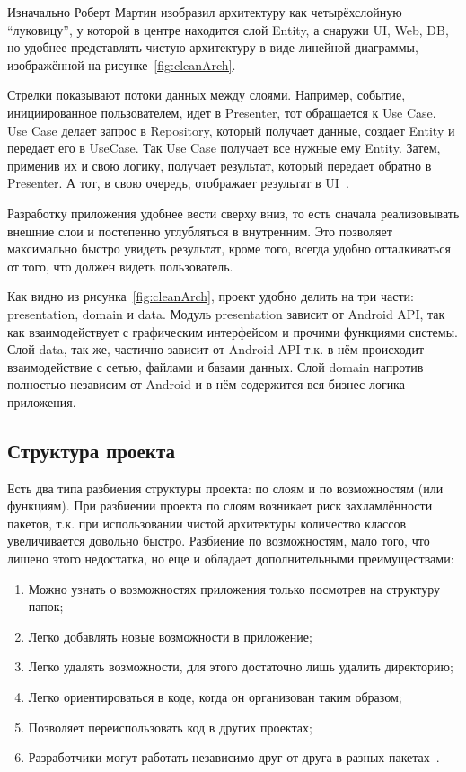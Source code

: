 Изначально Роберт Мартин изобразил архитектуру как четырёхслойную ``луковицу'', у которой в центре находится слой Entity, а снаружи UI, Web, DB, но удобнее представлять чистую архитектуру в виде линейной диаграммы, изображённой на рисунке~\ref{fig:cleanArch}.

Стрелки показывают потоки данных между слоями.
Например, событие, инициированное пользователем, идет в Presenter, тот обращается к Use Case.
Use Case делает запрос в Repository, который получает данные, создает Entity и передает его в UseCase.
Так Use Case получает все нужные ему Entity.
Затем, применив их и свою логику, получает результат, который передает обратно в Presenter.
А тот, в свою очередь, отображает результат в UI~\cite{habr:clean}.

Разработку приложения удобнее вести сверху вниз, то есть сначала реализовывать внешние слои и постепенно углубляться в внутренним.
Это позволяет максимально быстро увидеть результат, кроме того, всегда удобно отталкиваться от того, что должен видеть пользователь.

Как видно из рисунка~\ref{fig:cleanArch}, проект удобно делить на три части: presentation, domain и data.
Модуль presentation зависит от Android API, так как взаимодействует с графическим интерфейсом и прочими функциями системы.
Слой data, так же, частично зависит от Android API т.к. в нём происходит взаимодействие с сетью, файлами и базами данных.
Слой domain напротив полностью независим от Android и в нём содержится вся бизнес-логика приложения.

\subsection{Структура проекта}
\label{subsec:struct}

Есть два типа разбиения структуры проекта: по слоям и по возможностям (или функциям).
При разбиении проекта по слоям возникает риск захламлённости пакетов, т.к. при использовании чистой архитектуры количество классов увеличивается довольно быстро.
Разбиение по возможностям, мало того, что лишено этого недостатка, но еще и обладает дополнительными преимуществами:
\begin{enumerate}
  \item Можно узнать о возможностях приложения только посмотрев на структуру папок;
  \item Легко добавлять новые возможности в приложение;
  \item Легко удалять возможности, для этого достаточно лишь удалить директорию;
  \item Легко ориентироваться в коде, когда он организован таким образом;
  \item Позволяет переиспользовать код в других проектах;
  \item Разработчики могут работать независимо друг от друга в разных пакетах~\cite{medium:pbf}.
\end{enumerate}

